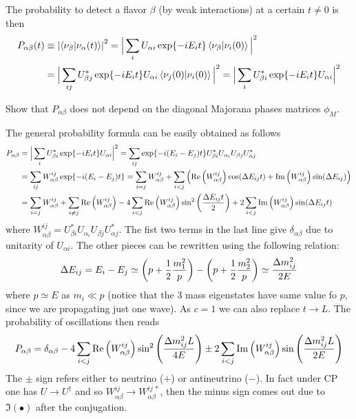 \documentclass[TheoreticalPhy_ModB.tex]{subfiles}
\begin{document}
The probability to detect a flavor $\beta$ (by weak interactions) at a certain $t\neq0$ is then
\[\begin{aligned}
P_{\alpha\beta}(t)&\equiv\left\vert\braket{\nu_\beta}{\nu_\alpha(t)}\right\vert^2
=\Big\vert\sum_iU_{\alpha i}\exp{-iE_it}\braket{\nu_\beta}{\nu_i(0)}\Big\vert^2\\
&=\Big\vert\sum_{ij}U_{\beta j}^*\exp{-iE_it}U_{\alpha i}\braket{\nu_j(0)}{\nu_i(0)}\Big\vert^2
=\Big\vert\sum_iU_{\beta i}^*\exp{-iE_it}U_{\alpha i}\Big\vert^2
\end{aligned}\]

\begin{exercise}
Show that $P_{\alpha\beta}$ does not depend on the diagonal Majorana phases matrices $\phi_M$.
\end{exercise}

The general probability formula can be easily obtained as follows
\[\begin{aligned}
P_{\alpha\beta}&=\Big\vert\sum_i U_{\beta i}^*\exp{-iE_it}U_{\alpha i}\Big\vert^2
=\sum_{ij}\exp{-i(E_i-E_j)t}U_{\beta i}^*U_{\alpha_i}U_{\beta j}U_{\alpha j}^*\\
&=\sum_{ij}W_{\alpha\beta}^{ij}\exp{-i(E_i-E_j)t}
=\sum_{i=j}W_{\alpha\beta}^{ij}+\sum_{i<j}\left(\Re\left(W_{\alpha\beta}^{ij}\right)\cos(\Delta E_{ij}t)+\Im\left(W_{\alpha\beta}^{ij}\right)\sin(\Delta E_{ij})\right)\\
&=\sum_{i=j}W_{\alpha\beta}^{ij}+\sum_{i\neq j}\Re\left(W_{\alpha\beta}^{ij}\right)-4\sum_{i<j}\Re\left(W_{\alpha\beta}^{ij}\right)\sin^2\left(\frac{\Delta E_{ij}t}2\right)+2\sum_{i<j}\Im\left(W_{\alpha\beta}^{ij}\right)\sin(\Delta E_{ij}t)
\end{aligned}\]
where $W_{\alpha\beta}^{ij}=U_{\beta i}^*U_{\alpha_i}U_{\beta j}U_{\alpha j}^*$. The fist two terms in the last line give $\delta_{\alpha\beta}$ due to unitarity of $U_{\alpha i}$. The other pieces can be rewritten using the following relation:
\[\Delta E_{ij}=E_i-E_j\simeq\left(p+\frac12\frac{m_1^2}p\right)-\left(p+\frac12\frac{m_2^2}p\right)\simeq\frac{\Delta m_{ij}^2}{2E}\]
where $p\simeq E$ as $m_i\ll p$ (notice that the 3 mass eigenstates have same value  fo $p$, since we are propagating just one wave). As $c=1$ we can also replace $t \rightarrow L$. The probability of oscillations then reads
\[P_{\alpha\beta}=\delta_{\alpha\beta}-4\sum_{i<j}\Re\left(W_{\alpha\beta}^{ij}\right)\sin^2\left(\frac{\Delta m_{ij}^2L}{4E}\right)\pm2\sum_{i<j}\Im\left(W_{\alpha\beta}^{ij}\right)\sin\left(\frac{\Delta m_{ij}^2L}{2E}\right)\]
The $\pm$ sign refers either to neutrino ($+$) or antineutrino ($-$). In fact under CP one has $U\rightarrow U^\dagger$ and so $W_{\alpha\beta}^{ij}\rightarrow W_{\alpha\beta}^{ij\,*}$, then the minus sign comes out due to $\Im(\bullet)$ after the conjugation.
\end{document}
